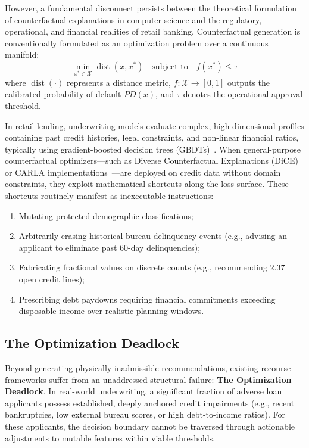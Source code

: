 \documentclass[manuscript,screen,review,anonymous]{acmart}
\begin{document}
However, a fundamental disconnect persists between the theoretical formulation of counterfactual explanations in computer science and the regulatory, operational, and financial realities of retail banking. Counterfactual generation is conventionally formulated as an optimization problem over a continuous manifold:
\begin{equation}
\min_{x^* \in \mathcal{X}} \operatorname{dist}(x, x^*) \quad \text{subject to} \quad f(x^*) \le \tau
\label{eq:standard_recourse}
\end{equation}
where $\operatorname{dist}(\cdot)$ represents a distance metric, $f: \mathcal{X} \to [0, 1]$ outputs the calibrated probability of default $PD(x)$, and $\tau$ denotes the operational approval threshold.

In retail lending, underwriting models evaluate complex, high-dimensional profiles containing past credit histories, legal constraints, and non-linear financial ratios, typically using gradient-boosted decision trees (GBDTs)~\cite{ke2017lightgbm}. When general-purpose counterfactual optimizers---such as Diverse Counterfactual Explanations (DiCE)~\cite{mothilal2020dice} or CARLA implementations~\cite{pawelczyk2021carla}---are deployed on credit data without domain constraints, they exploit mathematical shortcuts along the loss surface. These shortcuts routinely manifest as inexecutable instructions:
\begin{enumerate}
    \item Mutating protected demographic classifications;
    \item Arbitrarily erasing historical bureau delinquency events (e.g., advising an applicant to eliminate past 60-day delinquencies);
    \item Fabricating fractional values on discrete counts (e.g., recommending $2.37$ open credit lines);
    \item Prescribing debt paydowns requiring financial commitments exceeding disposable income over realistic planning windows.
\end{enumerate}

\subsection{The Optimization Deadlock}
Beyond generating physically inadmissible recommendations, existing recourse frameworks suffer from an unaddressed structural failure: \textbf{The Optimization Deadlock}. In real-world underwriting, a significant fraction of adverse loan applicants possess established, deeply anchored credit impairments (e.g., recent bankruptcies, low external bureau scores, or high debt-to-income ratios). For these applicants, the decision boundary cannot be traversed through actionable adjustments to mutable features within viable thresholds.
\end{document}
